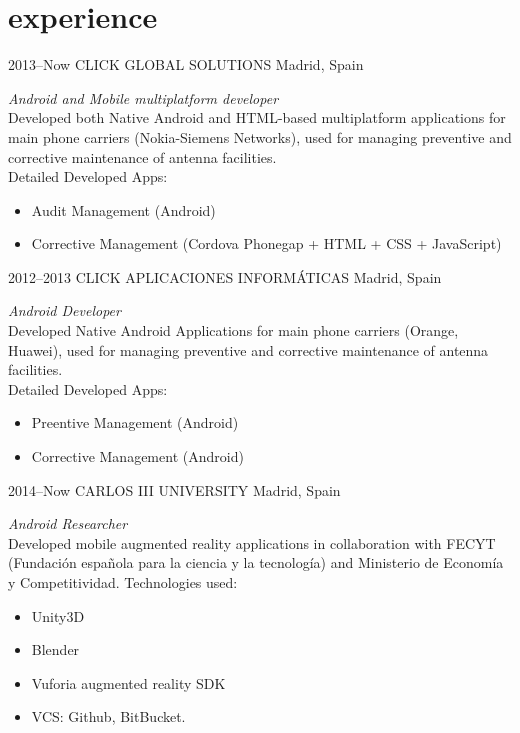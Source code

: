 \documentclass[]{friggeri-cv} %
\begin{document}

\section{experience}

\begin{entrylist}

\entry
{2013--Now}
{CLICK GLOBAL SOLUTIONS}
{Madrid, Spain}
{\emph{Android and Mobile multiplatform developer} \\
Developed both Native Android and HTML-based multiplatform applications for main phone carriers (Nokia-Siemens Networks), used for managing preventive and corrective maintenance of antenna facilities. \\
Detailed Developed Apps:

\begin{itemize}
\item Audit Management (Android)
\item Corrective Management (Cordova Phonegap + HTML + CSS + JavaScript)
\end{itemize}}


\entry
{2012--2013}
{CLICK APLICACIONES INFORMÁTICAS}
{Madrid, Spain}
{\emph{Android Developer} \\
Developed Native Android Applications for main phone carriers (Orange, Huawei), used for managing preventive and corrective maintenance of antenna facilities. \\
Detailed Developed Apps:

\begin{itemize}
\item Preentive Management (Android)
\item Corrective Management (Android)
\end{itemize}}

\entry
{2014--Now}
{CARLOS III UNIVERSITY}
{Madrid, Spain}
{\emph{Android Researcher} \\
Developed mobile augmented reality applications in collaboration with FECYT (Fundación española para la ciencia y la tecnología) and Ministerio de Economía y Competitividad. Technologies used:

\begin{itemize}
\item Unity3D
\item Blender
\item Vuforia augmented reality SDK
\item VCS: Github, BitBucket.
\end{itemize}}

\end{entrylist}
\end{document}
